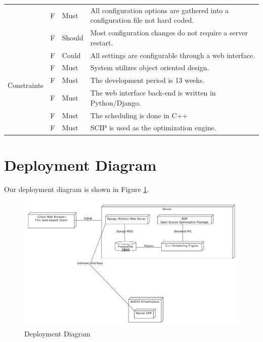 \documentclass[11pt]{article}
\newcounter{id}
\newcommand{\specid}{\arabic{id}\stepcounter{id}}
\begin{document}
\begin{longtable}{|m{1in}|m{0.3in}|m{0.6in}|m{4.5in}|}
\pagebreak
\multirow{3}{*}{Configurability}
 & F\specid & Must
 & All configuration options are gathered into a configuration file not hard coded. \\*  \cline{2-4}
 &F\specid & Should
 & Most configuration changes do not require a server restart. \\* \cline{2-4}
 & F\specid & Could
 & All settings are configurable through a web interface. \\* \hline\hline
 \multirow{3}{*}{Constraints}
 &F\specid & Must
 &  System utilizes object oriented design.\\* \cline{2-4}
 &F\specid & Must
 &  The development period is 13 weeks.\\* \cline{2-4}
 &F\specid & Must
 &  The web interface back-end is written in Python/Django.\\* \cline{2-4}
 &F\specid & Must
 &  The scheduling is done in C++\\* \cline{2-4}
 &F\specid & Must
 &  SCIP is used as the optimization engine.\\*
\end{longtable}

\section{Deployment Diagram} %

Our deployment diagram is shown in Figure \ref{fig:Deploy}.

\begin{figure}[ht]
	\centering
		\includegraphics[width = \textwidth]{deploymentdiagram.pdf}
	\caption{Deployment Diagram}
	\label{fig:Deploy}
\end{figure}
\end{document}
